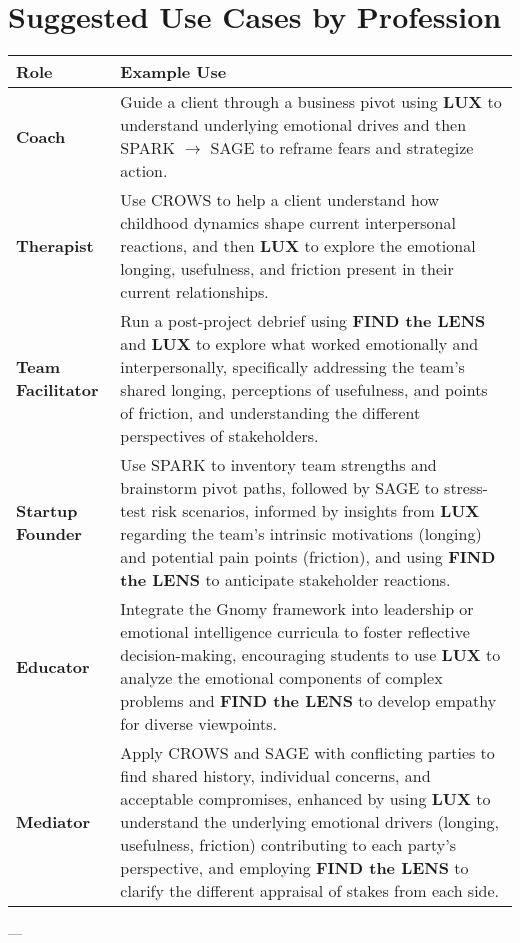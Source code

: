 \documentclass{article}
\begin{document}
\section{Suggested Use Cases by Profession}
\begin{tabular}{|p{}|p{}|}
    \hline
    \textbf{Role} & \textbf{Example Use} \\
    \hline
    \textbf{Coach} & Guide a client through a business pivot using \textbf{LUX} to understand underlying emotional drives and then SPARK $\rightarrow$ SAGE to reframe fears and strategize action. \\
    \textbf{Therapist} & Use CROWS to help a client understand how childhood dynamics shape current interpersonal reactions, and then \textbf{LUX} to explore the emotional longing, usefulness, and friction present in their current relationships. \\
    \textbf{Team Facilitator} & Run a post-project debrief using \textbf{FIND the LENS} and \textbf{LUX} to explore what worked emotionally and interpersonally, specifically addressing the team's shared longing, perceptions of usefulness, and points of friction, and understanding the different perspectives of stakeholders. \\
    \textbf{Startup Founder} & Use SPARK to inventory team strengths and brainstorm pivot paths, followed by SAGE to stress-test risk scenarios, informed by insights from \textbf{LUX} regarding the team's intrinsic motivations (longing) and potential pain points (friction), and using \textbf{FIND the LENS} to anticipate stakeholder reactions. \\
    \textbf{Educator} & Integrate the Gnomy framework into leadership or emotional intelligence curricula to foster reflective decision-making, encouraging students to use \textbf{LUX} to analyze the emotional components of complex problems and \textbf{FIND the LENS} to develop empathy for diverse viewpoints. \\
    \textbf{Mediator} & Apply CROWS and SAGE with conflicting parties to find shared history, individual concerns, and acceptable compromises, enhanced by using \textbf{LUX} to understand the underlying emotional drivers (longing, usefulness, friction) contributing to each party's perspective, and employing \textbf{FIND the LENS} to clarify the different appraisal of stakes from each side. \\
    \hline
\end{tabular}

---
\end{document}
